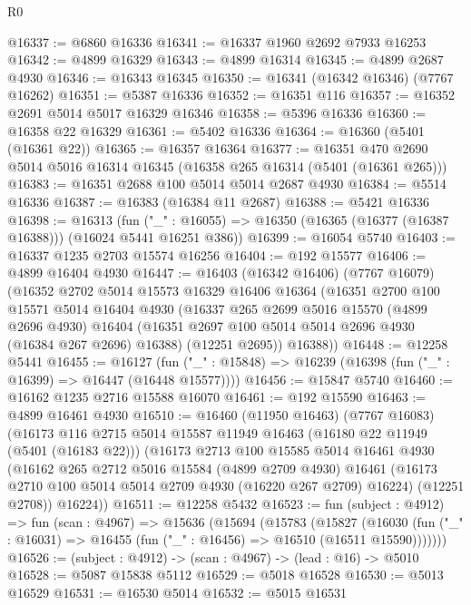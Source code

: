\begin{lexlean}{R0}
\begin{coremodule}
@16337 := @6860 @16336
@16341 := @16337 @1960 @2692 @7933 @16253
@16342 := @4899 @16329
@16343 := @4899 @16314
@16345 := @4899 @2687 @4930
@16346 := @16343 @16345
@16350 := @16341 (@16342 @16346) (@7767 @16262)
@16351 := @5387 @16336
@16352 := @16351 @116
@16357 := @16352 @2691 @5014 @5017 @16329 @16346
@16358 := @5396 @16336
@16360 := @16358 @22 @16329
@16361 := @5402 @16336
@16364 := @16360 (@5401 (@16361 @22))
@16365 := @16357 @16364
@16377 := @16351 @470 @2690 @5014 @5016 @16314 @16345 (@16358 @265 @16314 (@5401 (@16361 @265)))
@16383 := @16351 @2688 @100 @5014 @5014 @2687 @4930
@16384 := @5514 @16336
@16387 := @16383 (@16384 @11 @2687)
@16388 := @5421 @16336
@16398 := @16313
    (fun ("_" : @16055) => @16350 (@16365 (@16377 (@16387 @16388))) (@16024 @5441 @16251 @386))
@16399 := @16054 @5740
@16403 := @16337 @1235 @2703 @15574 @16256
@16404 := @192 @15577
@16406 := @4899 @16404 @4930
@16447 := @16403
    (@16342 @16406)
    (@7767 @16079)
    (@16352
      @2702
      @5014
      @15573
      @16329
      @16406
      @16364
      (@16351
        @2700
        @100
        @15571
        @5014
        @16404
        @4930
        (@16337
          @265
          @2699
          @5016
          @15570
          (@4899 @2696 @4930)
          @16404
          (@16351 @2697 @100 @5014 @5014 @2696 @4930 (@16384 @267 @2696) @16388)
          (@12251 @2695))
        @16388))
@16448 := @12258 @5441
@16455 := @16127
    (fun ("_" : @15848) => @16239 (@16398 (fun ("_" : @16399) => @16447 (@16448 @15577))))
@16456 := @15847 @5740
@16460 := @16162 @1235 @2716 @15588 @16070
@16461 := @192 @15590
@16463 := @4899 @16461 @4930
@16510 := @16460
    (@11950 @16463)
    (@7767 @16083)
    (@16173
      @116
      @2715
      @5014
      @15587
      @11949
      @16463
      (@16180 @22 @11949 (@5401 (@16183 @22)))
      (@16173
        @2713
        @100
        @15585
        @5014
        @16461
        @4930
        (@16162
          @265
          @2712
          @5016
          @15584
          (@4899 @2709 @4930)
          @16461
          (@16173 @2710 @100 @5014 @5014 @2709 @4930 (@16220 @267 @2709) @16224)
          (@12251 @2708))
        @16224))
@16511 := @12258 @5432
@16523 := fun (subject : @4912) =>
  fun (scan : @4967) =>
  @15636
    (@15694
      (@15783
        (@15827
          (@16030 (fun ("_" : @16031) => @16455 (fun ("_" : @16456) => @16510 (@16511 @15590)))))))
@16526 := (subject : @4912) -> (scan : @4967) -> (lead : @16) -> @5010
@16528 := @5087 @15838 @5112
@16529 := @5018 @16528
@16530 := @5013 @16529
@16531 := @16530 @5014
@16532 := @5015 @16531

\end{coremodule}
\end{lexlean}
